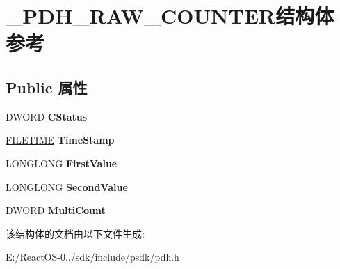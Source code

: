 \hypertarget{struct___p_d_h___r_a_w___c_o_u_n_t_e_r}{}\section{\+\_\+\+P\+D\+H\+\_\+\+R\+A\+W\+\_\+\+C\+O\+U\+N\+T\+E\+R结构体 参考}
\label{struct___p_d_h___r_a_w___c_o_u_n_t_e_r}
\subsection*{Public 属性}
\begin{DoxyCompactItemize}
\item 
\mbox{\label{struct___p_d_h___r_a_w___c_o_u_n_t_e_r_a3df95b4657f3444090c2a37fa10abb56}} 
D\+W\+O\+RD {\bfseries C\+Status}
\item 
\mbox{\label{struct___p_d_h___r_a_w___c_o_u_n_t_e_r_ad9b7727c7a174f1ced775000aa8f3c1c}} 
\hyperlink{struct___f_i_l_e_t_i_m_e}{F\+I\+L\+E\+T\+I\+ME} {\bfseries Time\+Stamp}
\item 
\mbox{\label{struct___p_d_h___r_a_w___c_o_u_n_t_e_r_ac08d59c803abb1ace7ee332236190f99}} 
L\+O\+N\+G\+L\+O\+NG {\bfseries First\+Value}
\item 
\mbox{\label{struct___p_d_h___r_a_w___c_o_u_n_t_e_r_a43fae0f23dc84f35164cf4e7869bad62}} 
L\+O\+N\+G\+L\+O\+NG {\bfseries Second\+Value}
\item 
\mbox{\label{struct___p_d_h___r_a_w___c_o_u_n_t_e_r_a8c0c2be0cdd85ba43e69a7edb571f156}} 
D\+W\+O\+RD {\bfseries Multi\+Count}
\end{DoxyCompactItemize}


该结构体的文档由以下文件生成\+:\begin{DoxyCompactItemize}
\item 
E\+:/\+React\+O\+S-\/0../sdk/include/psdk/pdh.\+h\end{DoxyCompactItemize}
